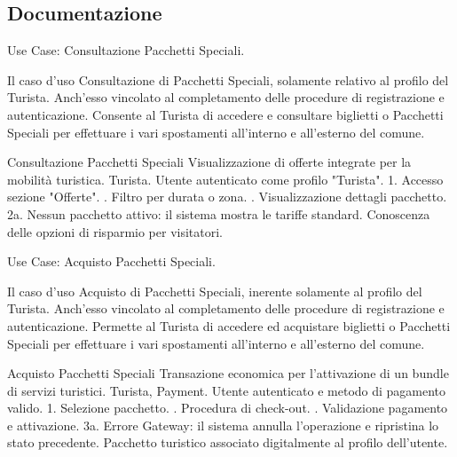 \subsection*{Documentazione}

\begin{center}
    Use Case: Consultazione Pacchetti Speciali. 
\end{center}
Il caso d'uso Consultazione di Pacchetti Speciali, solamente relativo al profilo del Turista. Anch'esso vincolato al completamento delle procedure di registrazione e autenticazione. Consente al Turista di accedere  e consultare biglietti o Pacchetti Speciali per effettuare i vari spostamenti all'interno e all'esterno del comune. 

\vspace{0.5cm}

\usecasetable
{Consultazione Pacchetti Speciali}
{Visualizzazione di offerte integrate per la mobilità turistica.}
{Turista.}
{Utente autenticato come profilo "Turista".}
{1. Accesso sezione "Offerte". . Filtro per durata o zona. . Visualizzazione dettagli pacchetto.}
{2a. Nessun pacchetto attivo: il sistema mostra le tariffe standard.}
{Conoscenza delle opzioni di risparmio per visitatori.}
\newpage

\begin{center}
    Use Case: Acquisto Pacchetti Speciali.
\end{center}
Il caso d'uso Acquisto di Pacchetti Speciali, inerente solamente al profilo del Turista. Anch'esso vincolato al completamento delle procedure di registrazione e autenticazione. Permette al Turista di accedere ed acquistare biglietti o Pacchetti Speciali per effettuare i vari spostamenti all'interno e all'esterno del comune. 

\vspace{0.5cm}

\usecasetable
{Acquisto Pacchetti Speciali}
{Transazione economica per l'attivazione di un bundle di servizi turistici.}
{Turista, Payment.}
{Utente autenticato e metodo di pagamento valido.}
{1. Selezione pacchetto. . Procedura di check-out. . Validazione pagamento e attivazione.}
{3a. Errore Gateway: il sistema annulla l'operazione e ripristina lo stato precedente.}
{Pacchetto turistico associato digitalmente al profilo dell'utente.}
\newpage

